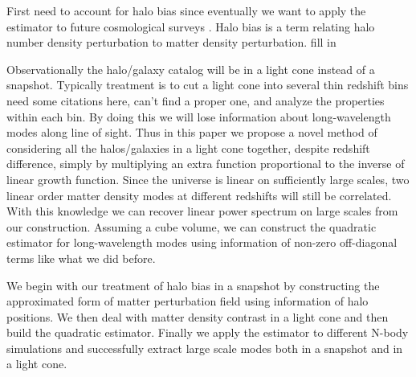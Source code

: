 \documentclass[prd,amsmath,amssymb,floatfix,superscriptaddress,nofootinbib,twocolumn]{revtex4-1}
\newcommand{\peikai}[1]{{\color{blue} #1}}
\begin{document}
First need to account for halo bias \cite{Kravtsov:1999hb}\cite{Desjacques:2018rev} since eventually we want to apply the estimator to future cosmological surveys \cite{LSST:2012ls}\cite{Wfirst:2012jg}\cite{DESI:2019ds}. Halo bias is a term relating halo number density perturbation to matter density perturbation. \peikai{fill in}

Observationally the halo/galaxy catalog will be in a light cone \cite{Carroll:1997gr} instead of a snapshot. Typically treatment is to cut a light cone into several thin redshift bins \peikai{need some citations here, can't find a proper one}, and analyze the properties within each bin. By doing this we will lose information about long-wavelength modes along line of sight. Thus in this paper we propose a novel method of considering all the halos/galaxies in a light cone together, despite redshift difference, simply by multiplying an extra function proportional to the inverse of linear growth function. Since the universe is linear on sufficiently large scales, two linear order matter density modes at different redshifts will still be correlated. With this knowledge we can recover linear power spectrum on large scales from our construction. Assuming a cube volume, we can construct the quadratic estimator for long-wavelength modes using information of non-zero off-diagonal terms like what we did before.

We begin with our treatment of halo bias in a snapshot by constructing the approximated form of matter perturbation field using information of halo positions. We then deal with matter density contrast in a light cone and then build the quadratic estimator. Finally we apply the estimator to different N-body simulations and successfully extract large scale modes both in a snapshot and in a light cone.
\end{document}
